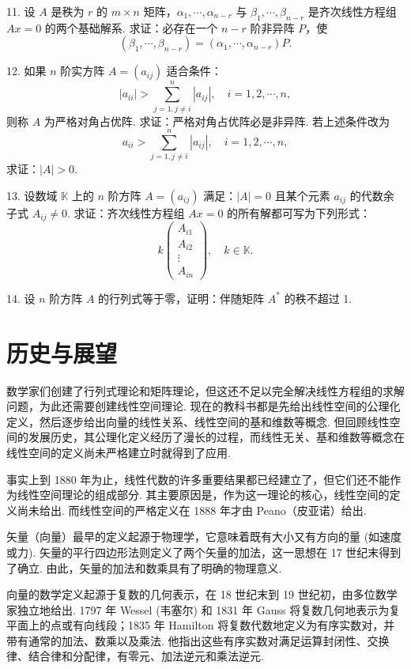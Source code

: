 \documentclass[UTF8,12pt,a4paper,fontset=fandol]{ctexart}
\begin{document}
11. 设 $A$ 是秩为 $r$ 的 $m\times n$ 矩阵，$\alpha_1,\cdots,\alpha_{n-r}$ 与 $\beta_1,\cdots,\beta_{n-r}$ 是齐次线性方程组 $Ax=0$ 的两个基础解系. 求证：必存在一个 $n-r$ 阶非异阵 $P$，使
\[
(\beta_1,\cdots,\beta_{n-r})=(\alpha_1,\cdots,\alpha_{n-r})P.
\]

12. 如果 $n$ 阶实方阵 $A=(a_{ij})$ 适合条件：
\[
|a_{ii}|>\sum_{j=1,j\neq i}^n |a_{ij}|,\quad i=1,2,\cdots,n,
\]
则称 $A$ 为严格对角占优阵. 求证：严格对角占优阵必是非异阵. 若上述条件改为
\[
a_{ii}>\sum_{j=1,j\neq i}^n |a_{ij}|,\quad i=1,2,\cdots,n,
\]
求证：$|A|>0$.

13. 设数域 $\mathbb{K}$ 上的 $n$ 阶方阵 $A=(a_{ij})$ 满足：$|A|=0$ 且某个元素 $a_{ij}$ 的代数余子式 $A_{ij}\neq 0$. 求证：齐次线性方程组 $Ax=0$ 的所有解都可写为下列形式：
\[
k\left(\begin{array}{c}
A_{i1}\\
A_{i2}\\
\vdots\\
A_{in}
\end{array}\right),\quad k\in\mathbb{K}.
\]

14. 设 $n$ 阶方阵 $A$ 的行列式等于零，证明：伴随矩阵 $A^*$ 的秩不超过 1.

\section*{历史与展望}

数学家们创建了行列式理论和矩阵理论，但这还不足以完全解决线性方程组的求解问题，为此还需要创建线性空间理论. 现在的教科书都是先给出线性空间的公理化定义，然后逐步给出向量的线性关系、线性空间的基和维数等概念. 但回顾线性空间的发展历史，其公理化定义经历了漫长的过程，而线性无关、基和维数等概念在线性空间的定义尚未严格建立时就得到了应用.

事实上到 1880 年为止，线性代数的许多重要结果都已经建立了，但它们还不能作为线性空间理论的组成部分. 其主要原因是，作为这一理论的核心，线性空间的定义尚未给出. 而线性空间的严格定义在 1888 年才由 Peano（皮亚诺）给出.

矢量（向量）最早的定义起源于物理学，它意味着既有大小又有方向的量 (如速度或力). 矢量的平行四边形法则定义了两个矢量的加法，这一思想在 17 世纪末得到了确立. 由此，矢量的加法和数乘具有了明确的物理意义.

向量的数学定义起源于复数的几何表示，在 18 世纪末到 19 世纪初，由多位数学家独立地给出. 1797 年 Wessel (韦塞尔) 和 1831 年 Gauss 将复数几何地表示为复平面上的点或有向线段；1835 年 Hamilton 将复数代数地定义为有序实数对，并带有通常的加法、数乘以及乘法. 他指出这些有序实数对满足运算封闭性、交换律、结合律和分配律，有零元、加法逆元和乘法逆元.
\end{document}
